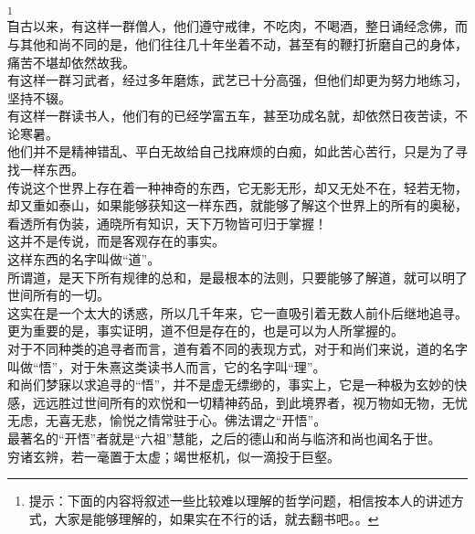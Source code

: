 \begin{multicols}{\theparacolNo}
\footnote{提示：下面的内容将叙述一些比较难以理解的哲学问题，相信按本人的讲述方式，大家是能够理解的，如果实在不行的话，就去翻书吧。。}\\

自古以来，有这样一群僧人，他们遵守戒律，不吃肉，不喝酒，整日诵经念佛，而与其他和尚不同的是，他们往往几十年坐着不动，甚至有的鞭打折磨自己的身体，痛苦不堪却依然故我。\\

有这样一群习武者，经过多年磨炼，武艺已十分高强，但他们却更为努力地练习，坚持不辍。\\

有这样一群读书人，他们有的已经学富五车，甚至功成名就，却依然日夜苦读，不论寒暑。\\

他们并不是精神错乱、平白无故给自己找麻烦的白痴，如此苦心苦行，只是为了寻找一样东西。\\

传说这个世界上存在着一种神奇的东西，它无影无形，却又无处不在，轻若无物，却又重如泰山，如果能够获知这一样东西，就能够了解这个世界上的所有的奥秘，看透所有伪装，通晓所有知识，天下万物皆可归于掌握！\\

这并不是传说，而是客观存在的事实。\\

这样东西的名字叫做“道”。\\

所谓道，是天下所有规律的总和，是最根本的法则，只要能够了解道，就可以明了世间所有的一切。\\

这实在是一个太大的诱惑，所以几千年来，它一直吸引着无数人前仆后继地追寻。更为重要的是，事实证明，道不但是存在的，也是可以为人所掌握的。\\

对于不同种类的追寻者而言，道有着不同的表现方式，对于和尚们来说，道的名字叫做“悟”，对于朱熹这类读书人而言，它的名字叫“理”。\\

和尚们梦寐以求追寻的“悟”，并不是虚无缥缈的，事实上，它是一种极为玄妙的快感，远远胜过世间所有的欢悦和一切精神药品，到此境界者，视万物如无物，无忧无虑，无喜无悲，愉悦之情常驻于心。佛法谓之“开悟”。\\

最著名的“开悟”者就是“六祖”慧能，之后的德山和尚与临济和尚也闻名于世。\\

穷诸玄辨，若一毫置于太虚；竭世枢机，似一滴投于巨壑。\\


\end{multicols}
